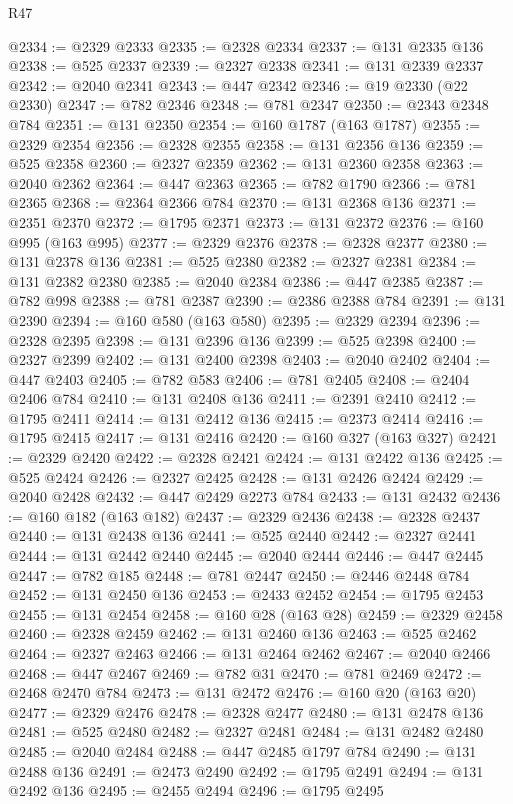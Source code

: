 \begin{lexlean}{R47}
\begin{coremodule}
@2334 := @2329 @2333
@2335 := @2328 @2334
@2337 := @131 @2335 @136
@2338 := @525 @2337
@2339 := @2327 @2338
@2341 := @131 @2339 @2337
@2342 := @2040 @2341
@2343 := @447 @2342
@2346 := @19 @2330 (@22 @2330)
@2347 := @782 @2346
@2348 := @781 @2347
@2350 := @2343 @2348 @784
@2351 := @131 @2350
@2354 := @160 @1787 (@163 @1787)
@2355 := @2329 @2354
@2356 := @2328 @2355
@2358 := @131 @2356 @136
@2359 := @525 @2358
@2360 := @2327 @2359
@2362 := @131 @2360 @2358
@2363 := @2040 @2362
@2364 := @447 @2363
@2365 := @782 @1790
@2366 := @781 @2365
@2368 := @2364 @2366 @784
@2370 := @131 @2368 @136
@2371 := @2351 @2370
@2372 := @1795 @2371
@2373 := @131 @2372
@2376 := @160 @995 (@163 @995)
@2377 := @2329 @2376
@2378 := @2328 @2377
@2380 := @131 @2378 @136
@2381 := @525 @2380
@2382 := @2327 @2381
@2384 := @131 @2382 @2380
@2385 := @2040 @2384
@2386 := @447 @2385
@2387 := @782 @998
@2388 := @781 @2387
@2390 := @2386 @2388 @784
@2391 := @131 @2390
@2394 := @160 @580 (@163 @580)
@2395 := @2329 @2394
@2396 := @2328 @2395
@2398 := @131 @2396 @136
@2399 := @525 @2398
@2400 := @2327 @2399
@2402 := @131 @2400 @2398
@2403 := @2040 @2402
@2404 := @447 @2403
@2405 := @782 @583
@2406 := @781 @2405
@2408 := @2404 @2406 @784
@2410 := @131 @2408 @136
@2411 := @2391 @2410
@2412 := @1795 @2411
@2414 := @131 @2412 @136
@2415 := @2373 @2414
@2416 := @1795 @2415
@2417 := @131 @2416
@2420 := @160 @327 (@163 @327)
@2421 := @2329 @2420
@2422 := @2328 @2421
@2424 := @131 @2422 @136
@2425 := @525 @2424
@2426 := @2327 @2425
@2428 := @131 @2426 @2424
@2429 := @2040 @2428
@2432 := @447 @2429 @2273 @784
@2433 := @131 @2432
@2436 := @160 @182 (@163 @182)
@2437 := @2329 @2436
@2438 := @2328 @2437
@2440 := @131 @2438 @136
@2441 := @525 @2440
@2442 := @2327 @2441
@2444 := @131 @2442 @2440
@2445 := @2040 @2444
@2446 := @447 @2445
@2447 := @782 @185
@2448 := @781 @2447
@2450 := @2446 @2448 @784
@2452 := @131 @2450 @136
@2453 := @2433 @2452
@2454 := @1795 @2453
@2455 := @131 @2454
@2458 := @160 @28 (@163 @28)
@2459 := @2329 @2458
@2460 := @2328 @2459
@2462 := @131 @2460 @136
@2463 := @525 @2462
@2464 := @2327 @2463
@2466 := @131 @2464 @2462
@2467 := @2040 @2466
@2468 := @447 @2467
@2469 := @782 @31
@2470 := @781 @2469
@2472 := @2468 @2470 @784
@2473 := @131 @2472
@2476 := @160 @20 (@163 @20)
@2477 := @2329 @2476
@2478 := @2328 @2477
@2480 := @131 @2478 @136
@2481 := @525 @2480
@2482 := @2327 @2481
@2484 := @131 @2482 @2480
@2485 := @2040 @2484
@2488 := @447 @2485 @1797 @784
@2490 := @131 @2488 @136
@2491 := @2473 @2490
@2492 := @1795 @2491
@2494 := @131 @2492 @136
@2495 := @2455 @2494
@2496 := @1795 @2495

\end{coremodule}
\end{lexlean}
